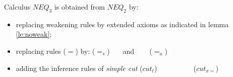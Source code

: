 \begin{DEFINITION} Calculus $NEQ_3$ is obtained from $NEQ_2$ by:
\begin{itemize}\MyLPar
\item replacing weakening rules by extended axioms as indicated in lemma \ref{le:noweak};
\item replacing rules  ($=$) by:
 ($=_{s}$)
\label{ru:K12s} \ \ \ 
and \ \ \ 
 ($=_{a}$)
\label{ru:K12a} 
\item adding the inference rules of {\em simple cut}
 ($cut_t$)\label{ru:sicut}
\ \ \ \ \ \ \ \ \ 
 ($cut_{x=}$)\label{ru:cutxeq}
\end{itemize}
\end{DEFINITION}
%

